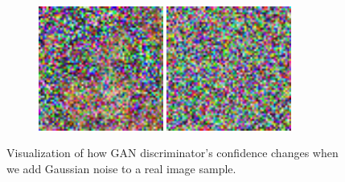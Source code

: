 \begin{figure}[h]
\begin{subfigure}[b]{0.5\textwidth}
		\includegraphics[width=0.45\textwidth]{figures/diversity_gan2_real_dis_gen_imgs_var50}
		\includegraphics[width=0.45\textwidth]{figures/diversity_gan2_real_dis_gen_imgs_var90}
	\end{subfigure}
	\caption{Visualization of how GAN discriminator's confidence changes when we add Gaussian noise to a real image sample.}
	\label{fig:changed_gen_image_real_dis}
\end{figure}

